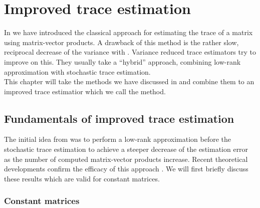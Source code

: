 \chapter{Improved trace estimation}
\label{chp:4-nystromchebyshev}

In  we have introduced the
classical approach for estimating the trace of a matrix using matrix-vector
products. A drawback of this method is the rather slow, reciprocal decrease of
the variance with . Variance reduced trace estimators
try to improve on this. They usually take a \enquote{hybrid} approach, combining
low-rank approximation with stochastic trace estimation.\\

This chapter will take the methods we have discussed in 
and  combine them to an improved trace estimatior which
we call the  method.


\section{Fundamentals of improved trace estimation}
\label{sec:4-nystromchebyshev-hybrid}

The initial idea from \cite{lin2017randomized} was to perform a low-rank
approximation before the stochastic trace estimation to achieve a
steeper decrease of the estimation error as the number of computed
matrix-vector products increase. Recent theoretical developments confirm the
efficacy of this approach \cite{meyer2021hutch,persson2022hutch}.
We will first briefly discuss these results which are valid 
for constant matrices.\\

\subsection{Constant matrices}
\label{subsec:4-nystromchebyshev-reduction-constant-matrices}

